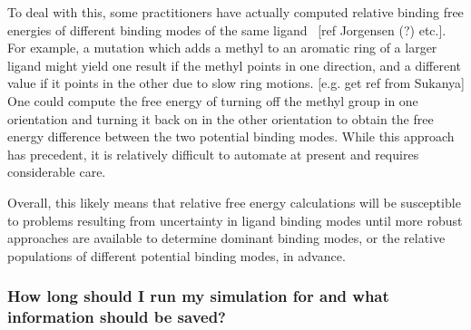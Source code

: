 \documentclass[9pt,bestpractices]{livecoms}
\begin{document}
To deal with this, some practitioners have actually computed relative binding free energies of different binding modes of the same ligand~\cite{Palma:2012:J.Comput.Chem.} [ref Jorgensen (?) etc.].
For example, a mutation which adds a methyl to an aromatic ring of a larger ligand might yield one result if the methyl points in one direction, and a different value if it points in the other due to slow ring motions. [e.g. get ref from Sukanya]
One could compute the free energy of turning off the methyl group in one orientation and turning it back on in the other orientation to obtain the free energy difference between the two potential binding modes.
While this approach has precedent, it is relatively difficult to automate at present and requires considerable care.

Overall, this likely means that relative free energy calculations will be susceptible to problems resulting from uncertainty in ligand binding modes until more robust approaches are available to determine dominant binding modes, or the relative populations of different potential binding modes, in advance.


\subsubsection*{How long should I run my simulation for and what information should be saved?}



% 
\end{document}
